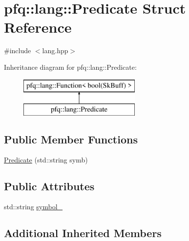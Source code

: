 \hypertarget{structpfq_1_1lang_1_1Predicate}{\section{pfq\+:\+:lang\+:\+:Predicate Struct Reference}
\label{structpfq_1_1lang_1_1Predicate}
}


{\ttfamily \#include $<$lang.\+hpp$>$}

Inheritance diagram for pfq\+:\+:lang\+:\+:Predicate\+:\begin{figure}[H]
\begin{center}
\leavevmode
\includegraphics[height=2.000000cm]{structpfq_1_1lang_1_1Predicate}
\end{center}
\end{figure}
\subsection*{Public Member Functions}
\begin{DoxyCompactItemize}
\item 
\hyperlink{structpfq_1_1lang_1_1Predicate_a508e8ecee71522146a784e1ee26719f5}{Predicate} (std\+::string symb)
\end{DoxyCompactItemize}
\subsection*{Public Attributes}
\begin{DoxyCompactItemize}
\item 
std\+::string \hyperlink{structpfq_1_1lang_1_1Predicate_af3caf778e1fba3f768925816405cdfce}{symbol\+\_\+}
\end{DoxyCompactItemize}
\subsection*{Additional Inherited Members}


